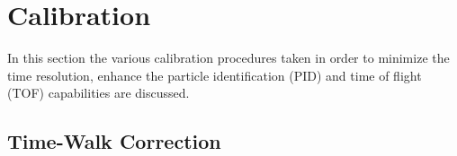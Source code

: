 \section{Calibration} \label{sec:calib}

In this section the various calibration procedures taken in order to minimize the time resolution, enhance the particle identification (PID) and time of flight (TOF) capabilities are discussed.

\subsection{Time-Walk Correction} \label{sec:calib_tw}

 